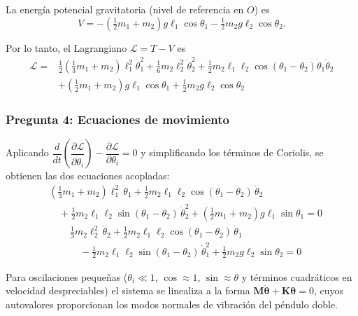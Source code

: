 \begin{sol}
La energía potencial gravitatoria (nivel de referencia en $O$) es
$$V = -\left(\tfrac12 m_1 + m_2\right)g\ell_1\cos\theta_1 - \tfrac12 m_2 g\ell_2\cos\theta_2.$$

Por lo tanto, el Lagrangiano $\mathcal{L}=T-V$ es
$$\boxed{\begin{aligned}
\mathcal{L} ={}& \tfrac12\left(\tfrac13 m_1 + m_2\right)\ell_1^2\dot\theta_1^2
+ \tfrac16 m_2\ell_2^2\dot\theta_2^2
+ \tfrac12 m_2\ell_1\ell_2\cos(\theta_1-\theta_2)\dot\theta_1\dot\theta_2 \\
&+ \left(\tfrac12 m_1 + m_2\right)g\ell_1\cos\theta_1 + \tfrac12 m_2 g\ell_2\cos\theta_2
\end{aligned}}$$

\subsubsection*{Pregunta 4: Ecuaciones de movimiento}

Aplicando $\dfrac{d}{dt}\!\left(\dfrac{\partial\mathcal{L}}{\partial\dot\theta_i}\right)
-\dfrac{\partial\mathcal{L}}{\partial\theta_i}=0$ y simplificando los términos de
Coriolis, se obtienen las dos ecuaciones acopladas:
$$\boxed{\begin{aligned}
&\left(\tfrac13 m_1 + m_2\right)\ell_1^2\,\ddot\theta_1
+ \tfrac12 m_2\ell_1\ell_2\cos(\theta_1-\theta_2)\,\ddot\theta_2 \\
&\quad + \tfrac12 m_2\ell_1\ell_2\sin(\theta_1-\theta_2)\,\dot\theta_2^2
+ \left(\tfrac12 m_1 + m_2\right)g\ell_1\sin\theta_1 = 0
\end{aligned}}$$
$$\boxed{\begin{aligned}
&\tfrac13 m_2\ell_2^2\,\ddot\theta_2
+ \tfrac12 m_2\ell_1\ell_2\cos(\theta_1-\theta_2)\,\ddot\theta_1 \\
&\quad - \tfrac12 m_2\ell_1\ell_2\sin(\theta_1-\theta_2)\,\dot\theta_1^2
+ \tfrac12 m_2 g\ell_2\sin\theta_2 = 0
\end{aligned}}$$

Para oscilaciones pequeñas ($\theta_i\ll1$, $\cos\approx1$, $\sin\approx\theta$ y términos
cuadráticos en velocidad despreciables) el sistema se linealiza a la forma
$\mathbf{M}\ddot{\boldsymbol\theta}+\mathbf{K}\boldsymbol\theta=0$, cuyos autovalores
proporcionan los modos normales de vibración del péndulo doble.

\end{sol}
